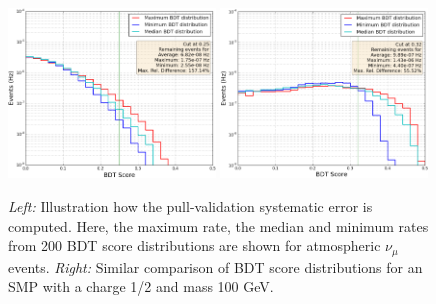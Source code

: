 \begin{table}[]
\centering
\caption{Results for the absolute numbers of the detector and flux uncertainties.}
\label{tab:detectoruncertainties}
\end{table}

\begin{figure}
\centering
\includegraphics[width=0.49\textwidth]{chapter8/img/PVUncertainty_sig_m_100_c_1ovr2_BDTCUT0p25_test_numu_atmos_bg.png}
\includegraphics[width=0.49\textwidth]{chapter8/img/PVUncertainty_sig_m_100_c_1ovr2_BDTCUT0p32_total_test_sig}
\caption{\textit{Left: }Illustration how the pull-validation systematic error is computed. Here, the maximum rate, the median and minimum rates from 200 BDT score distributions are shown for atmospheric $\nu_\mu$ events. \textit{Right: }Similar comparison of BDT score distributions for an SMP with a charge 1/2 and mass 100 GeV.}
\label{fig:pvuncertainty}
\end{figure}

